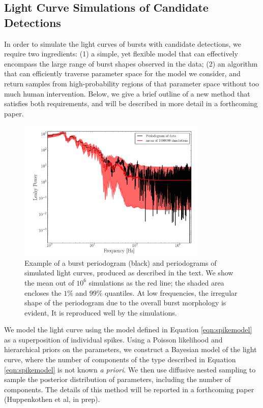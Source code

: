 \documentclass[numberedappendix]{emulateapj}
\begin{document}
\subsection{Light Curve Simulations of Candidate Detections}
\label{sec:dnest}
In order to simulate the light curves of bursts with candidate detections, we require two ingredients: (1) a simple, yet flexible model that can effectively encompass the large range of burst shapes observed in the data; (2) an algorithm that can efficiently traverse parameter space for the model we consider, and return samples from high-probability regions of that parameter space without too much human intervention. Below, we give a brief outline of a new method that satisfies both requirements, and will be described in more detail in a forthcoming paper.


\begin{figure}[htbp]
\begin{center}
\includegraphics[width=9cm]{example_burst_lcmodel_ps.png}
\caption{Example of a burst periodogram (black) and periodograms of simulated light curves, produced as described in the text. We show the mean out of $10^6$ simulations as the red line; the shaded area encloses the $1\%$ and $99\%$ quantiles. At low frequencies, the irregular shape
of the periodogram due to the overall burst morphology is evident, It is reproduced well by the simulations.}
\label{fig:burst_lcmodel_ps}
\end{center}
\end{figure}


We model the light curve using the model defined in Equation \ref{eqn:spikemodel} as a superposition of individual spikes. Using a Poisson likelihood and hierarchical priors on the parameters, we construct a Bayesian model of the light curve, where the number of components of the type described in Equation \ref{eqn:spikemodel} is not known {\it a priori}. We then use diffusive nested sampling \citep{brewer2011} to sample the posterior distribution of parameters, including the number of components. The details of this method will be reported in a forthcoming paper (Huppenkothen et al, in prep). 
\end{document}
